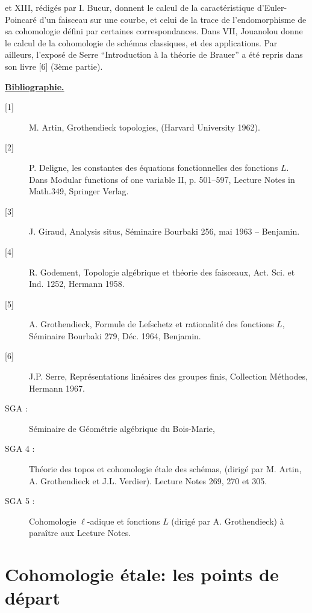 et XIII, rédigés par I. Bucur, donnent le calcul de la caractéristique
d'Euler-Poincaré d'un faisceau sur une courbe, et celui de la trace de
l'endomorphisme de sa cohomologie défini par certaines correspondances. Dans
VII, Jouanolou donne le calcul de la cohomologie de schémas classiques, et des
applications. Par ailleurs, l'exposé de Serre ``Introduction à la théorie de
Brauer'' a été repris dans son livre [6] (3ème partie).

\begin{center}
\textbf{\underline{Bibliographie.}}
\end{center}

\begin{description}
\item[{[1]}] M. Artin, Grothendieck topologies, (Harvard University 1962).
\item[{[2]}] P. Deligne, les constantes des équations fonctionnelles des
fonctions $L$. Dans Modular functions of one variable II, p. 501--597, Lecture
Notes in Math.349, Springer Verlag.
\item[{[3]}] J. Giraud, Analysis situs, Séminaire Bourbaki 256, mai 1963 --
Benjamin.
\item[{[4]}] R. Godement, Topologie algébrique et théorie des faisceaux, Act.
Sci. et Ind. 1252, Hermann 1958.
\item[{[5]}] A. Grothendieck, Formule de Lefschetz et rationalité des fonctions
$L$, Séminaire Bourbaki 279, Déc. 1964, Benjamin.
\item[{[6]}] J.P. Serre, Représentations linéaires des groupes finis,
Collection Méthodes, Hermann 1967.
\end{description}

\begin{description}
\item[SGA :] Séminaire de Géométrie algébrique du Bois-Marie,
\item[SGA 4 :] Théorie des topos et cohomologie étale des schémas, (dirigé par
M. Artin, A. Grothendieck et J.L. Verdier). Lecture Notes 269, 270 et 305.
\item[SGA 5 :] Cohomologie $\ell$-adique et fonctions $L$ (dirigé par A.
Grothendieck) à paraître aux Lecture Notes.
\end{description}



\chapter{Cohomologie étale: les points de départ}\label{I}

